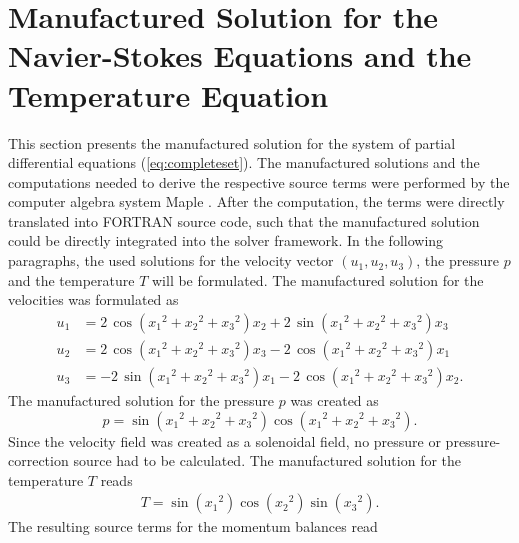 \section{Manufactured Solution for the Navier-Stokes Equations and the Temperature Equation}
\label{sec:manufacturedsolution}

This section presents the manufactured solution for the system of partial differential equations (\ref{eq:completeset}). The manufactured solutions and the computations needed to derive the respective source terms were performed by the computer algebra system Maple \textregistered \cite{maple}. After the computation, the terms were directly translated into FORTRAN source code, such that the manufactured solution could be directly integrated into the solver framework. In the following paragraphs, the used solutions for the velocity vector \((u_1,u_2,u_3)\), the pressure \(p\) and the temperature \(T\) will be formulated. The manufactured solution for the velocities was formulated as
\begin{align*}
  u_1 &= 2\,\cos \left( {x_1}^{2}+{x_2}^{2}+{x_3}^{2} \right) x_2+2\,\sin \left( {x_1}^{2}+{x_2}^{2}+{x_3}^{2} \right) x_3 \\[0.5em]
  u_2 &= 2\,\cos \left( {x_1}^{2}+{x_2}^{2}+{x_3}^{2} \right) x_3-2\,\cos \left( {x_1}^{2 }+{x_2}^{2}+{x_3}^{2} \right) x_1 \\[0.5em]
  u_3 &= -2\,\sin \left( {x_1}^{2}+{x_2}^{2}+{x_3}^{2} \right) x_1-2\,\cos \left( {x_1}^{ 2}+{x_2}^{2}+{x_3}^{2} \right) x_2.
\end{align*}
The manufactured solution for the pressure \(p\) was created as
\begin{displaymath}
  p = \sin \left( {x_1}^{2}+{x_2}^{2}+{x_3}^{2} \right) \cos \left( {x_1}^{2}+ {x_2}^{2 }+{x_3}^{2} \right).
\end{displaymath}
Since the velocity field was created as a solenoidal field, no pressure or pressure-correction source had to be calculated. The manufactured solution for the temperature \(T\) reads
\begin{align*}
  T=\sin \left( {x_1}^{2} \right) \cos \left( {x_2}^{2} \right) \sin \left( {x_3 }^{2} \right).
\end{align*}
The resulting source terms for the momentum balances read

